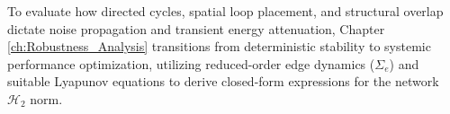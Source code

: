 To evaluate how directed cycles, spatial loop placement, and structural overlap dictate noise propagation and transient energy attenuation, Chapter \ref{ch:Robustness_Analysis} transitions from deterministic stability to systemic performance optimization, utilizing reduced-order edge dynamics ($\Sigma_e$) and suitable Lyapunov equations to derive closed-form expressions for the network $\mathcal{H}_2$ norm.
